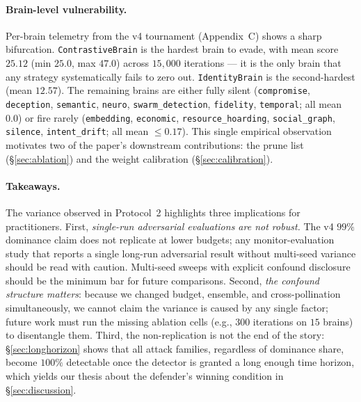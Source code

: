 \documentclass{article}
\begin{document}
\paragraph{Brain-level vulnerability.}
Per-brain telemetry from the v4 tournament (Appendix~C) shows a sharp
bifurcation. \texttt{ContrastiveBrain} is the hardest brain to evade,
with mean score $25.12$ (min $25.0$, max $47.0$) across $15{,}000$
iterations --- it is the only brain that any strategy systematically
fails to zero out. \texttt{IdentityBrain} is the second-hardest (mean
$12.57$). The remaining brains are either fully silent
(\texttt{compromise}, \texttt{deception}, \texttt{semantic},
\texttt{neuro}, \texttt{swarm\_detection}, \texttt{fidelity},
\texttt{temporal}; all mean $0.0$) or fire rarely
(\texttt{embedding}, \texttt{economic}, \texttt{resource\_hoarding},
\texttt{social\_graph}, \texttt{silence}, \texttt{intent\_drift};
all mean $\leq 0.17$). This single empirical observation motivates
two of the paper's downstream contributions: the prune list
(\S\ref{sec:ablation}) and the weight calibration
(\S\ref{sec:calibration}).

\paragraph{Takeaways.}
The variance observed in Protocol~2 highlights three implications for
practitioners. First, \emph{single-run adversarial evaluations are
not robust.} The v4 $99\%$ dominance claim does not replicate at lower
budgets; any monitor-evaluation study that reports a single long-run
adversarial result without multi-seed variance should be read with
caution. Multi-seed sweeps with explicit confound disclosure should
be the minimum bar for future comparisons. Second,
\emph{the confound structure matters}: because we changed budget,
ensemble, and cross-pollination simultaneously, we cannot claim the
variance is caused by any single factor; future work must run the
missing ablation cells (e.g., $300$ iterations on $15$ brains) to
disentangle them. Third, the non-replication is not the end of the
story: \S\ref{sec:longhorizon} shows that all attack families,
regardless of dominance share, become $100\%$ detectable once the
detector is granted a long enough time horizon, which yields our
thesis about the defender's winning condition in
\S\ref{sec:discussion}.

\end{document}
